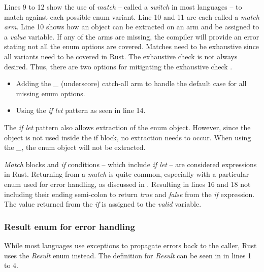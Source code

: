 
Lines 9 to 12 show the use of \textit{match} -- called a \textit{switch} in most languages -- to match against each possible enum variant.
Line 10 and 11 are each called a \textit{match arm}.
Line 10 shows how an object can be extracted on an arm and be assigned to a \textit{value} variable.
If any of the arms are missing, the compiler will provide an error stating not all the enum options are covered.
Matches need to be exhaustive since all variants need to be covered in Rust.
The exhaustive check is not always desired.
Thus, there are two options for mitigating the exhaustive check \cite{klabnik_2019_01}.

\begin{itemize}
	\item Adding the \textit{\_} (underscore) catch-all arm to handle the default case for all missing enum options.
	\item Using the \textit{if let} pattern as seen in line 14.
\end{itemize}

The \textit{if let} pattern also allows extraction of the enum object.
However, since the object is not used inside the if block, no extraction needs to occur.
When using the \textit{\_}, the enum object will not be extracted.

\textit{Match} blocks and \textit{if} conditions -- which include \textit{if let} -- are considered expressions in Rust.
Returning from a \textit{match} is quite common, especially with a particular enum used for error handling, as discussed in .
Resulting in lines 16 and 18 not including their ending semi-colon to return \textit{true} and \textit{false} from the \textit{if} expression.
The value returned from the \textit{if} is assigned to the \textit{valid} variable.

\subsubsection{Result enum for error handling}
\label{sec:result-enum}
While most languages use exceptions to propagate errors back to the caller, Rust uses the \textit{Result} enum instead.
The definition for \textit{Result} can be seen in  in lines 1 to 4.


